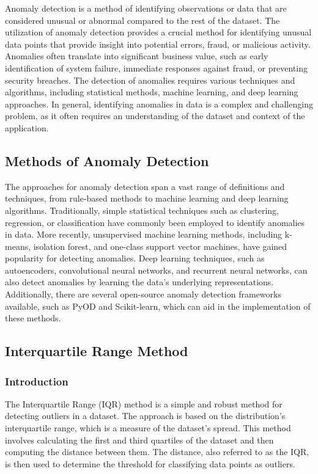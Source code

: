 Anomaly detection is a method of identifying observations or data that are considered unusual or abnormal compared to the rest of the dataset. The utilization of anomaly detection provides a crucial method for identifying unusual data points that provide insight into potential errors, fraud, or malicious activity. Anomalies often translate into significant business value, such as early identification of system failure, immediate responses against fraud, or preventing security breaches. The detection of anomalies requires various techniques and algorithms, including statistical methods, machine learning, and deep learning approaches. In general, identifying anomalies in data is a complex and challenging problem, as it often requires an understanding of the dataset and context of the application.

\subsection{Methods of Anomaly Detection}

The approaches for anomaly detection span a vast range of definitions and techniques, from rule-based methods to machine learning and deep learning algorithms. Traditionally, simple statistical techniques such as clustering, regression, or classification have commonly been employed to identify anomalies in data. More recently, unsupervised machine learning methods, including k-means, isolation forest, and one-class support vector machines, have gained popularity for detecting anomalies. Deep learning techniques, such as autoencoders, convolutional neural networks, and recurrent neural networks, can also detect anomalies by learning the data's underlying representations. Additionally, there are several open-source anomaly detection frameworks available, such as PyOD and Scikit-learn, which can aid in the implementation of these methods.

\subsection{Interquartile Range Method}

\subsubsection*{Introduction}

The Interquartile Range (IQR) method is a simple and robust method for detecting outliers in a dataset. The approach is based on the distribution's interquartile range, which is a measure of the dataset's spread. This method involves calculating the first and third quartiles of the dataset and then computing the distance between them. The distance, also referred to as the IQR, is then used to determine the threshold for classifying data points as outliers.

